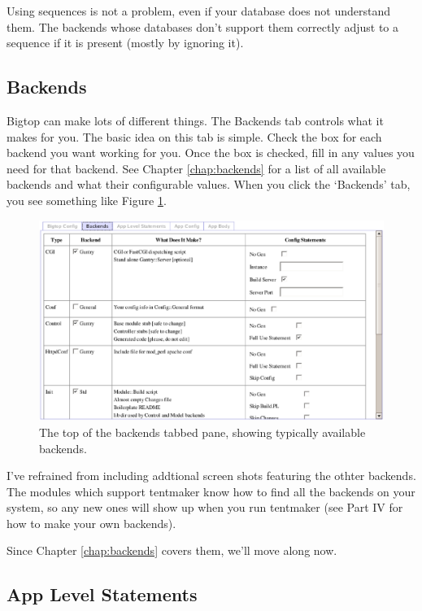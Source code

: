 Using sequences is not a problem, even if your database does not understand
them.  The backends whose databases don't support them correctly adjust to
a sequence if it is present (mostly by ignoring it).

\subsection*{Backends}

Bigtop can make lots of different things.  The Backends tab controls what
it makes for you.  The basic idea on this tab is simple.  Check the box
for each backend you want working for you.  Once the box is checked, fill
in any values you need for that backend.  See Chapter \ref{chap:backends}
for a list of all available backends and what their configurable values.
When you click the `Backends' tab, you see something like Figure
\ref{fig:backends}.

\begin{figure}
\includegraphics[width=6in]{backends}
\caption{The top of the backends tabbed pane, showing typically available
backends.}
\label{fig:backends}
\end{figure}

I've refrained from including addtional screen shots featuring the othter
backends.  The modules which support tentmaker know how to find all the
backends on your system, so any new ones will show up when you run tentmaker
(see Part IV for how to make your own backends).

Since Chapter \ref{chap:backends} covers them, we'll move along now.

\subsection*{App Level Statements}

